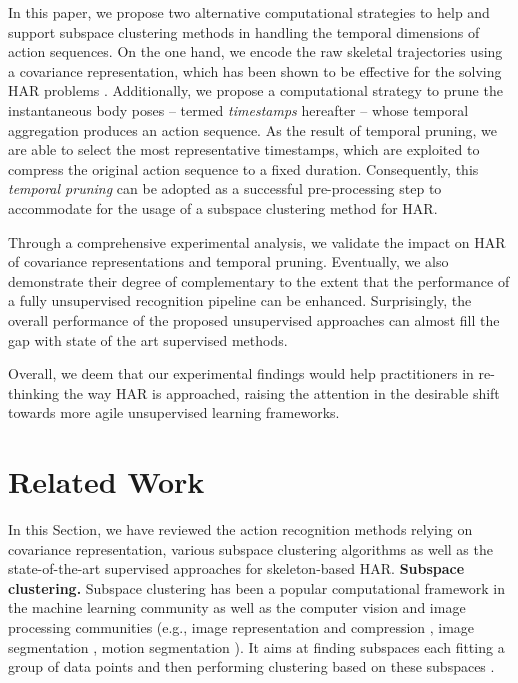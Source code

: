 \documentclass[10pt,a4paper,conference]{IEEEtran}
\begin{document}
In this paper, we propose two alternative computational strategies to help and support subspace clustering methods in handling the temporal dimensions of action sequences. On the one hand, we encode the raw skeletal trajectories using a covariance representation, which has been shown to be effective for the solving HAR problems \cite{cavazza2019scalable}.
Additionally, we propose a computational strategy to prune the instantaneous body poses -- termed \emph{timestamps} hereafter -- whose temporal aggregation produces an action sequence. As the result of temporal pruning, we are able to select the most representative timestamps, which are exploited to compress the original action sequence to a fixed duration. Consequently, this \emph{temporal pruning} can be adopted as a successful pre-processing step to accommodate for the usage of a subspace clustering method for HAR. 

Through a comprehensive experimental analysis, we validate the impact on HAR of covariance representations and temporal pruning. 
Eventually, we also demonstrate their degree of complementary to the extent that the performance of a fully unsupervised recognition pipeline can be enhanced. Surprisingly, the overall performance of the proposed unsupervised approaches can almost fill the gap with state of the art supervised methods. 





Overall, we deem that our experimental findings would help practitioners in re-thinking the way HAR is approached, raising the attention in the desirable shift towards more agile unsupervised learning frameworks.

\section{Related Work}\label{sec:relatedWork}
In this Section, we have reviewed the action recognition methods relying on covariance representation, various subspace clustering algorithms as well as the state-of-the-art supervised approaches for skeleton-based HAR. \newline
\textbf{Subspace clustering.}
Subspace clustering has been a popular computational framework in the machine learning community as well as the computer vision and image processing communities (e.g., image representation and compression \cite{Hong2006}, image segmentation \cite{Yang2008}, motion segmentation \cite{Fan2006}).
It aims at finding subspaces each ﬁtting a group of data points and then performing clustering based on these subspaces \cite{vidal2011subspace}.
\end{document}
